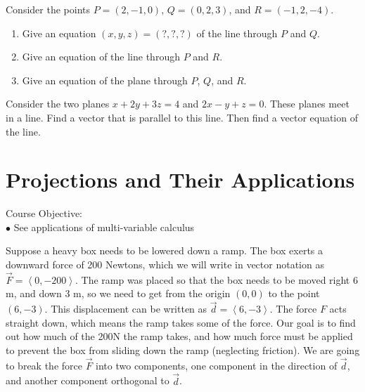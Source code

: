 \begin{problem}
 Consider the points $P=(2,-1,0)$, $Q=(0,2,3)$, and $R=(-1,2,-4)$.  
\begin{enumerate}
 \item Give an equation $(x,y,z)=(?,?,?)$ of the line through $P$ and $Q$.
 \item Give an equation of the line through $P$ and $R$.
 \item Give an equation of the plane through $P$, $Q$, and $R$. 
\end{enumerate}
\end{problem}

\begin{problem}  
%
Consider the two planes $x+2y+3z=4$ and $2x-y+z=0$.  These planes meet in a line.  Find a vector that is parallel to this line.  Then find a vector equation of the line.
\end{problem}


\section{Projections and Their Applications}
\large Course Objective: \normalsize \\
\indent $\bullet$ See applications of multi-variable calculus

\vskip0.2in

Suppose a heavy box needs to be lowered down a ramp.  
The box exerts a downward force of 200 Newtons, which we will write in vector notation as $\vec F=\left<0,-200\right>$. 
The ramp was placed so that the box needs to be moved right 6 m, and down 3 m, so we need to get from the origin $(0,0)$ to the point $(6,-3)$.  This displacement can be written as $\vec d=\left<6,-3\right>$. The force $F$ acts straight down, which means the ramp takes some of the force. Our goal is to find out how much of the 200N the ramp takes, and how much force must be applied to prevent the box from sliding down the ramp (neglecting friction). We are going to break the force $\vec F$ into two components, one component in the direction of $\vec d$, and another component orthogonal to $\vec d$. 

